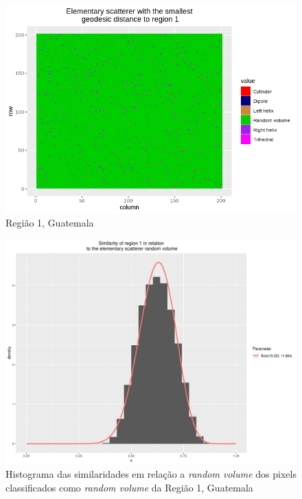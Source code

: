 \documentclass[12pt]{article}
\begin{document}
\begin{figure}[!h]
    \centering    
    \includegraphics[width = 0.85\linewidth]{../../Images/Report_18_12_20/Classifier_Geo_Dist/Class_Map/Guate/region1_predomain.png}
    \caption{Região 1, Guatemala}
    \label{fig:class_map_r1}
\end{figure}

\begin{figure}[!h]
    \centering   
    \includegraphics[width = 0.85\linewidth]{../../Images/Report_18_12_20/Classifier_Geo_Dist/Histograms/Guate/region1_rv_sm_filter.pdf}
    \caption{Histograma das similaridades em relação a \textit{random volume} dos pixels classificados como \textit{random volume} da Região 1, Guatemala}
    \label{fig:class_hist_r1_rv}
\end{figure}
\end{document}
